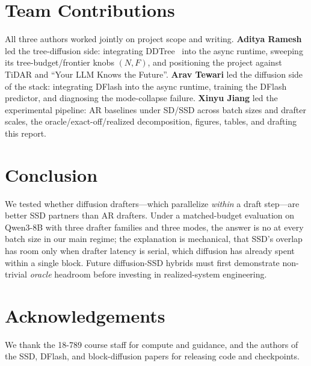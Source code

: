 \documentclass{article}
\begin{document}
\section{Team Contributions}
\label{sec:contrib}
All three authors worked jointly on project scope and writing.
\textbf{Aditya Ramesh} led the tree-diffusion side: integrating DDTree~\citep{ringel2026ddtree} into the async runtime, sweeping its tree-budget/frontier knobs $(N,F)$, and positioning the project against TiDAR and ``Your LLM Knows the Future''.
\textbf{Arav Tewari} led the diffusion side of the stack: integrating DFlash into the async runtime, training the DFlash predictor, and diagnosing the mode-collapse failure.
\textbf{Xinyu Jiang} led the experimental pipeline: AR baselines under SD/SSD across batch sizes and drafter scales, the oracle/exact-off/realized decomposition, figures, tables, and drafting this report.

\section{Conclusion}
\label{sec:conc}
We tested whether diffusion drafters---which parallelize \emph{within} a draft step---are better SSD partners than AR drafters.
Under a matched-budget evaluation on Qwen3-8B with three drafter families and three modes, the answer is no at every batch size in our main regime; the explanation is mechanical, that SSD's overlap has room only when drafter latency is serial, which diffusion has already spent within a single block.
Future diffusion-SSD hybrids must first demonstrate non-trivial \emph{oracle} headroom before investing in realized-system engineering.

\section*{Acknowledgements}
We thank the 18-789 course staff for compute and guidance, and the authors of the SSD, DFlash, and block-diffusion papers for releasing code and checkpoints.



\end{document}
